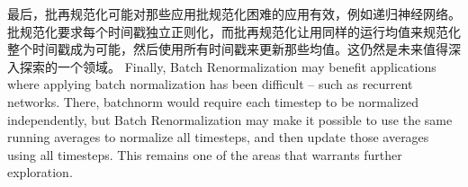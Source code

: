 最后，批再规范化可能对那些应用批规范化困难的应用有效，例如递归神经网络。批规范化要求每个时间戳独立正则化，而批再规范化让用同样的运行均值来规范化整个时间戳成为可能，然后使用所有时间戳来更新那些均值。这仍然是未来值得深入探索的一个领域。
Finally, Batch Renormalization may benefit applications where applying batch normalization has been difficult -- such as recurrent networks. There, batchnorm would require each timestep to be normalized independently, but Batch Renormalization may make it possible to use the same running averages to normalize all timesteps, and then update those averages using all timesteps. This remains one of the areas that warrants further exploration.
